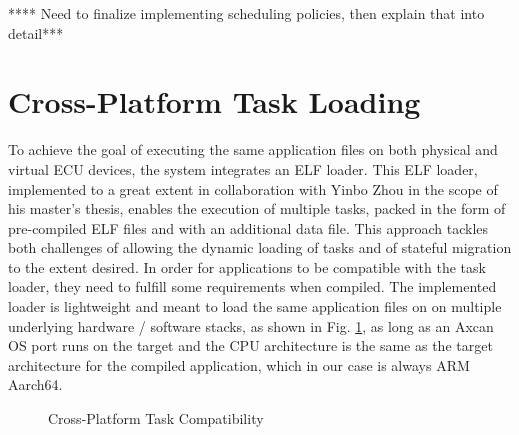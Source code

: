 **** Need to finalize implementing scheduling policies, then explain that into detail***

\section{Cross-Platform Task Loading}

To achieve the goal of executing the same application files on both physical and virtual ECU devices, the system integrates an ELF loader. This ELF loader, implemented to a great extent in collaboration with Yinbo Zhou in the scope of his master's thesis, enables the execution of multiple tasks, packed in the form of pre-compiled ELF files and with an additional data file. This approach tackles both challenges of allowing the dynamic loading of tasks and of stateful migration to the extent desired. In order for applications to be compatible with the task loader, they need to fulfill some requirements when compiled. The implemented loader is lightweight and meant to load the same application files on on multiple underlying hardware / software stacks, as shown in Fig. \ref{fig:multiplatform_tasks}, as long as an Axcan OS port runs on the target and the CPU architecture is the same as the target architecture for the compiled application, which in our case is always ARM Aarch64.


%	
%	

\begin{figure}
	\centering
	
	\caption{Cross-Platform Task Compatibility}
	\label{fig:multiplatform_tasks}
\end{figure}

